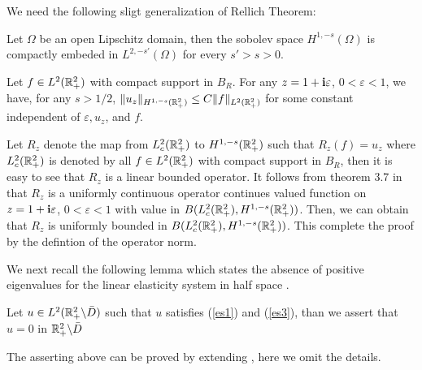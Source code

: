 \documentclass[12pt]{iopart}
\begin{document}
We need the following sligt generalization of Rellich Theorem:
\begin{lem}\label{rellich}
	Let $\Omega$ be an open Lipschitz domain, then the sobolev space $H^{1,-s}(\Omega)$ is compactly embeded in $L^{2,-s'}(\Omega)$ for every $s'>s>0$.
\end{lem}

\begin{lem}{\label{newton}}
	Let  $ f  \in L^2 ({\mathbb{R}}^2_+) $ with compact support in $B_R$. For any $z=1+\mathbf{i}\varepsilon$, $0<\varepsilon<1$, we have, for any $s>1/2$,
	$\|u_z\|_{H^{1,-s}({\mathbb{R}}^2_+)}\le C\|f\|_{L^2({\mathbb{R}}^2_+)}$ for some constant independent of $\varepsilon, u_z$, and $f$.
\end{lem}
\debproof
Let $R_z$ denote the map from $L^2_c({\mathbb{R}}^2_+)$ to $H^{1,-s}({\mathbb{R}}^2_+)$ such that $R_z(f)=u_z$ where $L^2_c({\mathbb{R}}^2_+)$ is denoted by all $ f  \in L^2 ({\mathbb{R}}^2_+) $ with compact support in $B_R$, then it is easy to see that $R_z$ is a linear bounded operator. It follows from theorem 3.7 in \cite{Yves1988} that $R_z$ is a uniformly continuous operator continues valued function on $z=1+\mathbf{i}\varepsilon$, $0<\varepsilon<1$ with value in $B(L^2_c({\mathbb{R}}^2_+),H^{1,-s}({\mathbb{R}}^2_+))$. Then, we can obtain that $R_z$ is uniformly bounded in $B(L^2_c({\mathbb{R}}^2_+),H^{1,-s}({\mathbb{R}}^2_+))$. This complete the proof by the defintion of the operator norm.
\finproof

We next recall the following lemma which states the absence of positive eigenvalues for the linear elasticity system in half space \cite{sini2004}.
\begin{lem} \label{absen}
	Let $u\in L^2({\mathbb{R}}^2_+ \backslash \bar D)$ such that $u$ satisfies (\ref{es1}) and (\ref{es3}), than we assert that $u=0$ in ${\mathbb{R}}^2_+ \backslash \bar D$
\end{lem}
\debproof
The asserting above can be proved by extending \cite[theorem 3.1]{sini2004}, here we omit the details.
\finproof
\end{document}
